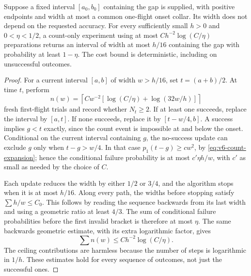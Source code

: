 \begin{lemma}
\label{lem:v6-coarse-search}
Suppose a fixed interval $[a_0,b_0]$ containing the gap is supplied,
with positive endpoints and width at most a common one-flight onset
collar. Its width does not depend on the requested accuracy. For every
sufficiently small $h>0$ and $0<\eta<1/2$, a count-only experiment
using at most $C h^{-2}\log(C/\eta)$ preparations returns an interval
of width at most $h/16$ containing the gap with probability at least
$1-\eta$. The cost bound is deterministic, including on unsuccessful
outcomes.
\end{lemma}
\begin{proof}
For a current interval $[a,b]$ of width $w>h/16$, set $t=(a+b)/2$.
At time $t$, perform
\[
 n(w)=\left\lceil Cw^{-2}
       \left[\log(C/\eta)+\log(32w/h)\right]\right\rceil
\]
fresh first-flight trials and record whether $N_t\ge2$. If at least
one succeeds, replace the interval by $[a,t]$. If none succeeds,
replace it by $[t-w/4,b]$. A success implies $g<t$ exactly, since the
count event is impossible at and below the onset. Conditional on the
current interval containing $g$, the no-success update can exclude $g$
only when $t-g>w/4$. In that case
$p_1(t-g)\ge c w^2$, by \eqref{eq:v6-count-expansion}; hence the
conditional failure probability is at most $c'\eta h/w$, with $c'$
as small as needed by the choice of $C$.

Each update reduces the width by either $1/2$ or $3/4$, and the
algorithm stops when it is at most $h/16$. Along every path, the widths
before stopping satisfy $\sum h/w\le C_0$. This follows by reading
the sequence backwards from its last width and using a geometric ratio
at least $4/3$. The sum of conditional failure probabilities before the
first invalid bracket is therefore at most $\eta$. The same backwards
geometric estimate, with its extra logarithmic factor, gives
\[
 \sum n(w)\le C h^{-2}\log(C/\eta).
\]
The ceiling contributions are harmless because the number of steps is
logarithmic in $1/h$. These estimates hold for every sequence of
outcomes, not just the successful ones.
\end{proof}

